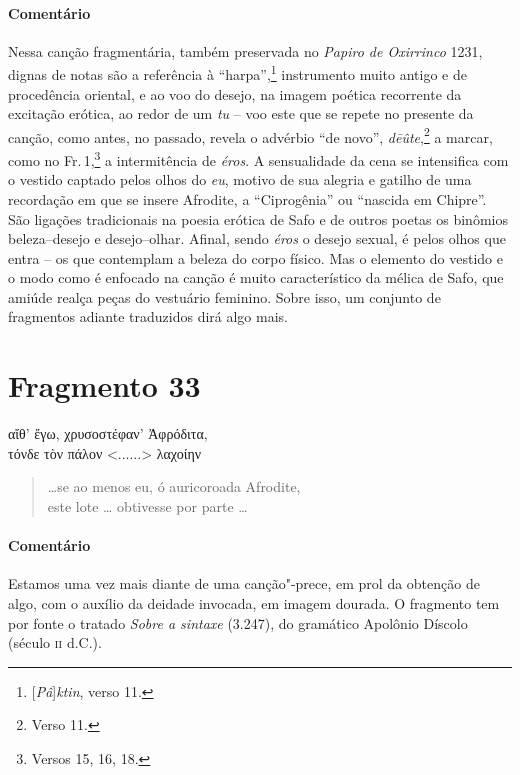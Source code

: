 \medskip

{\paragraph{Comentário} Nessa canção fragmentária, também preservada no \textit{Papiro de Oxirrinco}
1231, dignas de notas são a referência à ``harpa'',\footnote{[\textit{Pâ}]\textit{ktin}, verso 11.} instrumento muito
antigo e de procedência oriental, e ao voo do desejo, na imagem poética
recorrente da excitação erótica, ao redor de um \textit{tu} -- voo este que se repete
no presente da canção, como antes, no passado, revela o advérbio ``de
novo'', \textit{dēûte},\footnote{Verso 11.} a marcar, como no Fr.\,1,\footnote{Versos 15, 16, 18.} a intermitência de \textit{éros}. A sensualidade da cena se intensifica com o vestido captado pelos olhos do \textit{eu}, motivo de sua alegria e gatilho de uma recordação em que se insere Afrodite, a
``Ciprogênia'' ou ``nascida em Chipre''. São ligações tradicionais na
poesia erótica de Safo e de outros poetas os binômios beleza--desejo e
desejo--olhar. Afinal, sendo \textit{éros} o desejo sexual, é pelos olhos que entra -- os que contemplam a beleza do corpo físico. Mas o elemento do vestido e o modo como é enfocado na canção é muito característico da mélica de Safo, que amiúde realça peças do vestuário feminino. Sobre isso, um conjunto de fragmentos adiante traduzidos dirá algo mais.}


\pagebreak

\section{Fragmento 33}

\begin{gkverse}
αἴθ’ ἔγω, χρυσοστέφαν’ Ἀφρόδιτα,\\
τόνδε τὸν πάλον <......> λαχοίην
\end{gkverse}

\begin{verse}
\ldots{}se ao menos eu, ó auricoroada Afrodite,\\
este lote \ldots{} obtivesse por parte \ldots{}
\end{verse}

\medskip

{\paragraph{Comentário} Estamos uma vez mais diante de uma canção"-prece, em prol da obtenção de algo,
com o auxílio da deidade invocada, em imagem dourada. O fragmento tem por fonte
o tratado \textit{Sobre a sintaxe} (3.247), do gramático Apolônio Díscolo (século
\textsc{ii} d.C.).}

